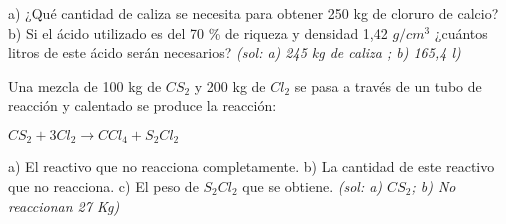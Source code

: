 \begin{multicols}{2}
\begin{problem}
a)	¿Qué cantidad de caliza se necesita para obtener 250 kg de cloruro de calcio?
b)	Si el ácido utilizado es del 70 \% de riqueza y densidad 1,42 $g/cm^3$ ¿cuántos litros de este ácido serán necesarios? \textit{\scriptsize(sol: a) 245 kg de caliza ; b) 165,4 l)}
\end{problem}
\begin{problem}
Una mezcla de 100 kg de $CS_2$ y 200 kg de $Cl_2$ se pasa a través de un tubo de reacción y calentado se produce la reacción:
\begin{center}
$CS_2 + 3Cl_2 \longrightarrow CCl_4 + S_2Cl_2$
\end{center}
a)	El reactivo que no reacciona completamente.
b)	La cantidad de este reactivo que no reacciona.
c)	El peso de $S_2Cl_2$ que se obtiene. \textit{\scriptsize(sol: a) $CS_2$; b) No reaccionan 27 Kg)}
\end{problem}
\end{multicols}